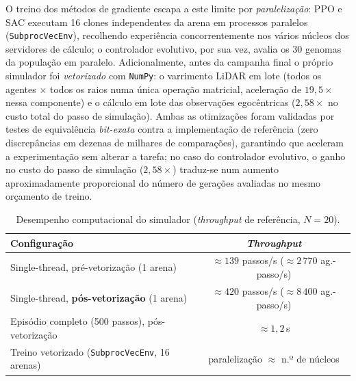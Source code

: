 \documentclass[12pt,reqno, twoside]{amsbook}
\theoremstyle{plain}
\numberwithin{equation}{chapter}
\numberwithin{section}{chapter}
\numberwithin{table}{chapter}
\numberwithin{figure}{chapter}
\begin{document}
O treino dos métodos de gradiente escapa a este limite por \emph{paralelização}: PPO e SAC executam 16 clones independentes da arena em processos paralelos (\texttt{SubprocVecEnv}), recolhendo experiência concorrentemente nos vários núcleos dos servidores de cálculo; o controlador evolutivo, por sua vez, avalia os 30 genomas da população em paralelo. Adicionalmente, antes da campanha final o próprio simulador foi \emph{vetorizado} com \texttt{NumPy}: o varrimento LiDAR em lote (todos os agentes $\times$ todos os raios numa única operação matricial, aceleração de $19{,}5\times$ nessa componente) e o cálculo em lote das observações egocêntricas ($2{,}58\times$ no custo total do passo de simulação). Ambas as otimizações foram validadas por testes de equivalência \emph{bit-exata} contra a implementação de referência (zero discrepâncias em dezenas de milhares de comparações), garantindo que aceleram a experimentação sem alterar a tarefa; no caso do controlador evolutivo, o ganho no custo do passo de simulação ($2{,}58\times$) traduz-se num aumento aproximadamente proporcional do número de gerações avaliadas no mesmo orçamento de treino.

\begin{table}[!htbp]
\centering
\footnotesize
\caption[Desempenho computacional do simulador]{Desempenho computacional do simulador (\textit{throughput} de referência, $N=20$).}
\label{tab:res_computacional}
\renewcommand{\arraystretch}{1.3}
\begin{tabular}{|l|c|}
\hline
\textbf{Configuração} & \textbf{\textit{Throughput}} \\ \hline
Single-thread, pré-vetorização (1 arena) & $\approx 139$ passos/s ($\approx 2\,770$ ag.-passo/s) \\ \hline
Single-thread, \textbf{pós-vetorização} (1 arena) & $\approx 420$ passos/s ($\approx 8\,400$ ag.-passo/s) \\ \hline
Episódio completo (500 passos), pós-vetorização & $\approx 1{,}2$\,s \\ \hline
Treino vetorizado (\texttt{SubprocVecEnv}, 16 arenas) & paralelização $\approx$ n.º de núcleos \\ \hline
\end{tabular}
\end{table}
\end{document}
